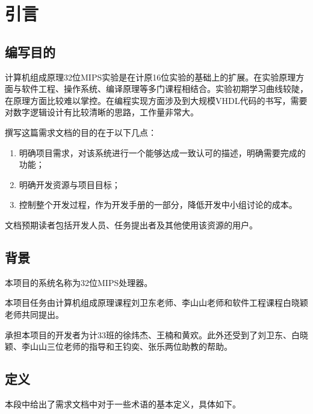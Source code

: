 \newpage
\section{引言}
\subsection{编写目的}
计算机组成原理32位MIPS实验是在计原16位实验的基础上的扩展。在实验原理方面与软件工程、操作系统、编译原理等多门课程相结合。实验初期学习曲线较陡，在原理方面比较难以掌控。在编程实现方面涉及到大规模VHDL代码的书写，需要对数字逻辑设计有比较清晰的思路，工作量非常大。

撰写这篇需求文档的目的在于以下几点：
\begin{enumerate}
	\item 明确项目需求，对该系统进行一个能够达成一致认可的描述，明确需要完成的功能；
	\item 明确开发资源与项目目标；
	\item 控制整个开发过程，作为开发手册的一部分，降低开发中小组讨论的成本。
\end{enumerate}

文档预期读者包括开发人员、任务提出者及其他使用该资源的用户。
\subsection{背景}
本项目的系统名称为32位MIPS处理器。

本项目任务由计算机组成原理课程刘卫东老师、李山山老师和软件工程课程白晓颖老师共同提出。

承担本项目的开发者为计33班的徐炜杰、王楠和黄欢。此外还受到了刘卫东、白晓颖、李山山三位老师的指导和王钧奕、张乐两位助教的帮助。
\subsection{定义}
本段中给出了需求文档中对于一些术语的基本定义，具体如下。

